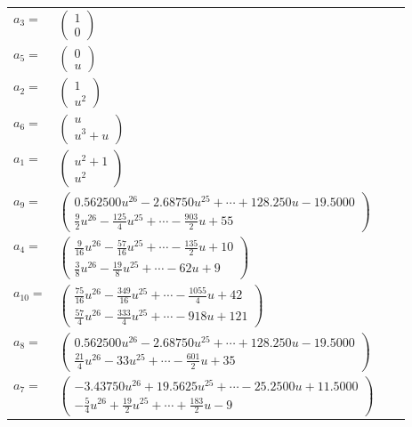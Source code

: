 \documentclass[1p]{elsarticle_modified}
\theoremstyle{definition}
\begin{document}
\begin{tabular}{m{7pt} m{180pt} m{7pt} m{180pt} }
\flushright $a_{3}=$&$\begin{pmatrix}1\\0\end{pmatrix}$ \\
\flushright $a_{5}=$&$\begin{pmatrix}0\\u\end{pmatrix}$ \\
\flushright $a_{2}=$&$\begin{pmatrix}1\\u^2\end{pmatrix}$ \\
\flushright $a_{6}=$&$\begin{pmatrix}u\\u^3+u\end{pmatrix}$ \\
\flushright $a_{1}=$&$\begin{pmatrix}u^2+1\\u^2\end{pmatrix}$ \\
\flushright $a_{9}=$&$\begin{pmatrix}0.562500 u^{26}-2.68750 u^{25}+\cdots+128.250 u-19.5000\\\frac{9}{2} u^{26}-\frac{125}{4} u^{25}+\cdots-\frac{903}{2} u+55\end{pmatrix}$ \\
\flushright $a_{4}=$&$\begin{pmatrix}\frac{9}{16} u^{26}-\frac{57}{16} u^{25}+\cdots-\frac{135}{2} u+10\\\frac{3}{8} u^{26}-\frac{19}{8} u^{25}+\cdots-62 u+9\end{pmatrix}$ \\
\flushright $a_{10}=$&$\begin{pmatrix}\frac{75}{16} u^{26}-\frac{349}{16} u^{25}+\cdots-\frac{1055}{4} u+42\\\frac{57}{4} u^{26}-\frac{333}{4} u^{25}+\cdots-918 u+121\end{pmatrix}$ \\
\flushright $a_{8}=$&$\begin{pmatrix}0.562500 u^{26}-2.68750 u^{25}+\cdots+128.250 u-19.5000\\\frac{21}{4} u^{26}-33 u^{25}+\cdots-\frac{601}{2} u+35\end{pmatrix}$ \\
\flushright $a_{7}=$&$\begin{pmatrix}-3.43750 u^{26}+19.5625 u^{25}+\cdots-25.2500 u+11.5000\\-\frac{5}{4} u^{26}+\frac{19}{2} u^{25}+\cdots+\frac{183}{2} u-9\end{pmatrix}$ \\

\end{tabular}
\end{document}
